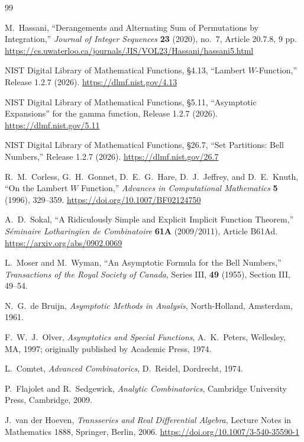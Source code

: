 \documentclass[11pt,oneside]{article}
\theoremstyle{plain}
\theoremstyle{definition}
\theoremstyle{remark}
\begin{document}
\begin{thebibliography}{99}

M.~Hassani,
``Derangements and Alternating Sum of Permutations by Integration,''
\emph{Journal of Integer Sequences} \textbf{23} (2020), no.~7,
Article 20.7.8, 9 pp.
\url{https://cs.uwaterloo.ca/journals/JIS/VOL23/Hassani/hassani5.html}

NIST Digital Library of Mathematical Functions,
\S4.13, ``Lambert \(W\)-Function,'' Release 1.2.7 (2026).
\url{https://dlmf.nist.gov/4.13}

NIST Digital Library of Mathematical Functions,
\S5.11, ``Asymptotic Expansions'' for the gamma function,
Release 1.2.7 (2026).
\url{https://dlmf.nist.gov/5.11}

NIST Digital Library of Mathematical Functions,
\S26.7, ``Set Partitions: Bell Numbers,'' Release 1.2.7 (2026).
\url{https://dlmf.nist.gov/26.7}

R.~M.~Corless, G.~H.~Gonnet, D.~E.~G.~Hare, D.~J.~Jeffrey, and D.~E.~Knuth,
``On the Lambert \(W\) Function,''
\emph{Advances in Computational Mathematics} \textbf{5} (1996), 329--359.
\url{https://doi.org/10.1007/BF02124750}

A.~D.~Sokal,
``A Ridiculously Simple and Explicit Implicit Function Theorem,''
\emph{S\'eminaire Lotharingien de Combinatoire} \textbf{61A}
(2009/2011), Article B61Ad.
\url{https://arxiv.org/abs/0902.0069}

L.~Moser and M.~Wyman,
``An Asymptotic Formula for the Bell Numbers,''
\emph{Transactions of the Royal Society of Canada}, Series III,
\textbf{49} (1955), Section III, 49--54.

N.~G.~de Bruijn,
\emph{Asymptotic Methods in Analysis},
North-Holland, Amsterdam, 1961.

F.~W.~J.~Olver,
\emph{Asymptotics and Special Functions},
A.~K.~Peters, Wellesley, MA, 1997; originally published by Academic Press,
1974.

L.~Comtet,
\emph{Advanced Combinatorics},
D.~Reidel, Dordrecht, 1974.

P.~Flajolet and R.~Sedgewick,
\emph{Analytic Combinatorics},
Cambridge University Press, Cambridge, 2009.

J.~van der Hoeven,
\emph{Transseries and Real Differential Algebra},
Lecture Notes in Mathematics 1888, Springer, Berlin, 2006.
\url{https://doi.org/10.1007/3-540-35590-1}

\end{thebibliography}
\end{document}
